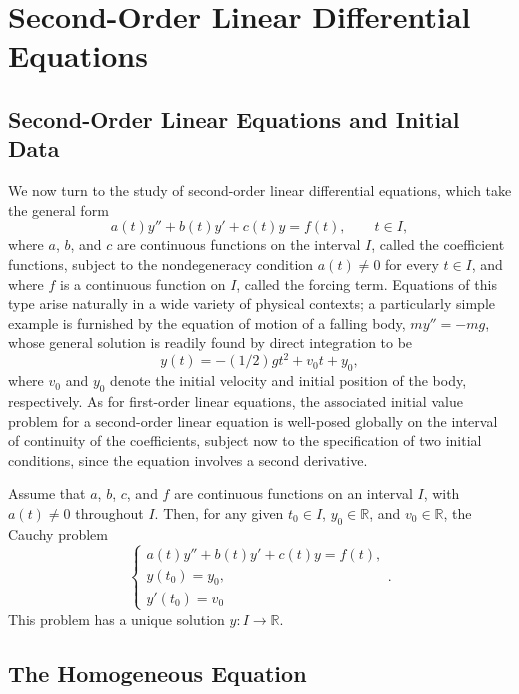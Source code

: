 \section{Second-Order Linear Differential Equations}

\subsection{Second-Order Linear Equations and Initial Data}

We now turn to the study of second-order linear differential equations, which take the general form
\[
a(t) y'' + b(t) y' + c(t) y = f(t), \qquad t \in I,
\] where $a$, $b$, and $c$ are continuous functions on the interval $I$, called the coefficient functions, subject to the nondegeneracy condition $a(t) \neq 0$ for every $t \in I$, and where $f$ is a continuous function on $I$, called the forcing term. Equations of this type arise naturally in a wide variety of physical contexts; a particularly simple example is furnished by the equation of motion of a falling body, $m y'' = -mg$, whose general solution is readily found by direct integration to be
\[
y(t) = -(1/2) g t^2 + v_0 t + y_0,
\] where $v_0$ and $y_0$ denote the initial velocity and initial position of the body, respectively. As for first-order linear equations, the associated initial value problem for a second-order linear equation is well-posed globally on the interval of continuity of the coefficients, subject now to the specification of two initial conditions, since the equation involves a second derivative.

\begin{theorem}
Assume that $a$, $b$, $c$, and $f$ are continuous functions on an interval $I$, with $a(t) \neq 0$ throughout $I$. Then, for any given $t_0 \in I$, $y_0 \in \mathbb{R}$, and $v_0 \in \mathbb{R}$, the Cauchy problem
\[
\begin{cases}
a(t) y'' + b(t) y' + c(t) y = f(t), \\
y(t_0) = y_0, \\
y'(t_0) = v_0
\end{cases}.
\]
This problem has a unique solution $y : I \to \mathbb{R}$.
\end{theorem}

\subsection{The Homogeneous Equation}

